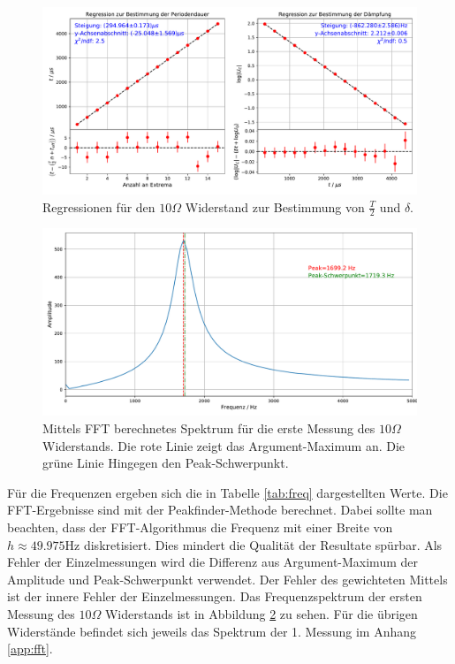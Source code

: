 \documentclass[a4paper, 12pt]{scrartcl}
\begin{document}
\begin{figure}[h]
\centering
\includegraphics[width=\textwidth]{plots/reg_schwingung3.pdf}
\caption{Regressionen für den $10\Omega$ Widerstand zur Bestimmung von $\frac{T}{2}$ und $\delta$.}
\label{abb:reg1}
\end{figure}

\begin{figure}[h]
\centering
\includegraphics[width=\textwidth]{plots/fft/fft_schwingung3_1.pdf}
\caption{Mittels FFT berechnetes Spektrum für die erste Messung des $10\Omega$ Widerstands. Die rote Linie zeigt das Argument-Maximum an. Die grüne Linie Hingegen den Peak-Schwerpunkt.}
\label{abb:fft1}
\end{figure}

Für die Frequenzen ergeben sich die in Tabelle \ref{tab:freq} dargestellten Werte. Die FFT-Ergebnisse sind mit der Peakfinder-Methode berechnet. Dabei sollte man beachten, dass der FFT-Algorithmus die Frequenz mit einer Breite von $h\approx 49.975 \text{Hz}$ diskretisiert. Dies mindert die Qualität der Resultate spürbar. Als Fehler der Einzelmessungen wird die Differenz aus Argument-Maximum der Amplitude und Peak-Schwerpunkt verwendet. Der Fehler des gewichteten Mittels ist der innere Fehler der Einzelmessungen. Das Frequenzspektrum der ersten Messung des $10\Omega$ Widerstands ist in Abbildung \ref{abb:fft1} zu sehen. Für die übrigen Widerstände befindet sich jeweils das Spektrum der 1. Messung im Anhang \ref{app:fft}.
\end{document}
